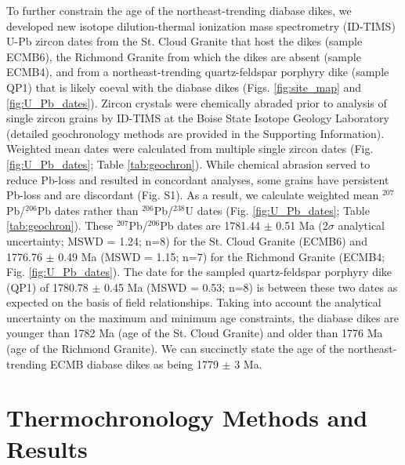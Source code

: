 \documentclass[draft]{agujournal2019}
\begin{document}
To further constrain the age of the northeast-trending diabase dikes, we developed new isotope dilution-thermal ionization mass spectrometry (ID-TIMS) U-Pb zircon dates from the St. Cloud Granite that host the dikes (sample ECMB6), the Richmond Granite from which the dikes are absent (sample ECMB4), and from a northeast-trending quartz-feldspar porphyry dike (sample QP1) that is likely coeval with the diabase dikes (Figs. \ref{fig:site_map} and \ref{fig:U_Pb_dates}). Zircon crystals were chemically abraded prior to analysis of single zircon grains by ID-TIMS at the Boise State Isotope Geology Laboratory (detailed geochronology methods are provided in the Supporting Information). Weighted mean dates were calculated from multiple single zircon dates (Fig. \ref{fig:U_Pb_dates}; Table \ref{tab:geochron}). While chemical abrasion served to reduce Pb-loss and resulted in concordant analyses, some grains have persistent Pb-loss and are discordant (Fig. S1). As a result, we calculate weighted mean  $^{207}$Pb/$^{206}$Pb dates rather than $^{206}$Pb/$^{238}$U dates (Fig. \ref{fig:U_Pb_dates}; Table \ref{tab:geochron}). These $^{207}$Pb/$^{206}$Pb dates are 1781.44 $\pm$ 0.51 Ma (2$\sigma$ analytical uncertainty; MSWD = 1.24; n=8) for the St. Cloud Granite (ECMB6) and 1776.76 $\pm$ 0.49 Ma (MSWD = 1.15; n=7) for the Richmond Granite (ECMB4; Fig. \ref{fig:U_Pb_dates}). The date for the sampled quartz-feldspar porphyry dike (QP1) of 1780.78 $\pm$ 0.45 Ma (MSWD = 0.53; n=8) is between these two dates as expected on the basis of field relationships. Taking into account the analytical uncertainty on the maximum and minimum age constraints, the diabase dikes are younger than 1782 Ma (age of the St. Cloud Granite) and older than 1776 Ma (age of the Richmond Granite). We can succinctly state the age of the northeast-trending ECMB diabase dikes as being 1779 $\pm$ 3 Ma. 

\section{Thermochronology Methods and Results}
\end{document}
